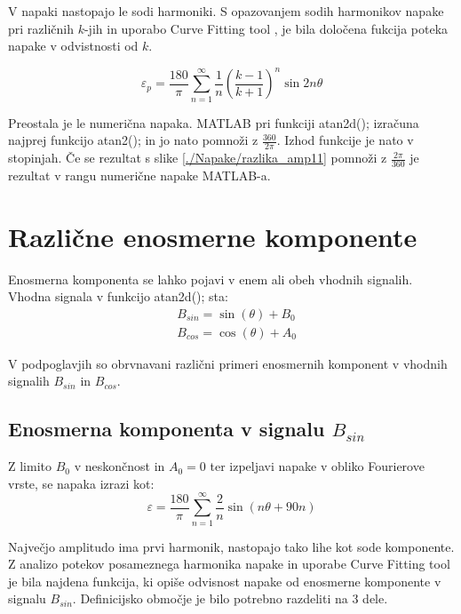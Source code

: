 V napaki nastopajo le sodi harmoniki. S opazovanjem sodih harmonikov napake pri različnih $k$-jih in uporabo Curve Fitting tool \cite{cftool}, je bila določena fukcija poteka napake v odvistnosti od $k$. 

\begin{equation}
\label{vrsta_k}
\varepsilon_p =\frac{180}{\pi}\sum_{n=1}^{\infty}\frac{1}{n}(\frac{k-1}{k+1})^n \sin 2 n \theta
\end{equation}


Preostala je le numerična napaka. MATLAB pri funkciji atan2d(); izračuna najprej funkcijo atan2(); in jo nato pomnoži z $\frac{360}{2\pi}$. Izhod funkcije je nato v stopinjah. Če se rezultat s slike \ref{./Napake/razlika_amp11} pomnoži z $\frac{2\pi}{360}$ je rezultat v rangu numerične napake MATLAB-a.
\newpage
\section{Različne enosmerne komponente}
Enosmerna komponenta se lahko pojavi v enem ali obeh vhodnih signalih.
Vhodna signala v funkcijo atan2d(); sta:
\begin{eqnarray}
\label{equ:def_sin_ama}
&B_{sin} = \sin(\theta) + B_0\\
\label{equ:def_cos_amp}
&B_{cos} =\cos(\theta) +A_0
\end{eqnarray}

V podpoglavjih so obrvnavani različni primeri enosmernih komponent v vhodnih signalih $B_{sin}$ in $B_{cos}$.
\subsection{Enosmerna komponenta v signalu $B_{sin}$}

Z limito $B_0$ v neskončnost in $A_0 = 0$ ter izpeljavi napake v obliko Fourierove vrste, se napaka izrazi kot:
\begin{equation}
\varepsilon = \frac{180}{\pi}\sum_{n=1}^{\infty}\frac{2}{n} \sin (n \theta + 90 n)
\end{equation}

Največjo amplitudo ima prvi harmonik, nastopajo tako lihe kot sode komponente.
Z analizo potekov posameznega harmonika napake in uporabe Curve Fitting tool je bila najdena funkcija, ki opiše odvisnost napake od enosmerne komponente v signalu $B_{sin}$. Definicijsko območje je bilo potrebno razdeliti na 3 dele.

